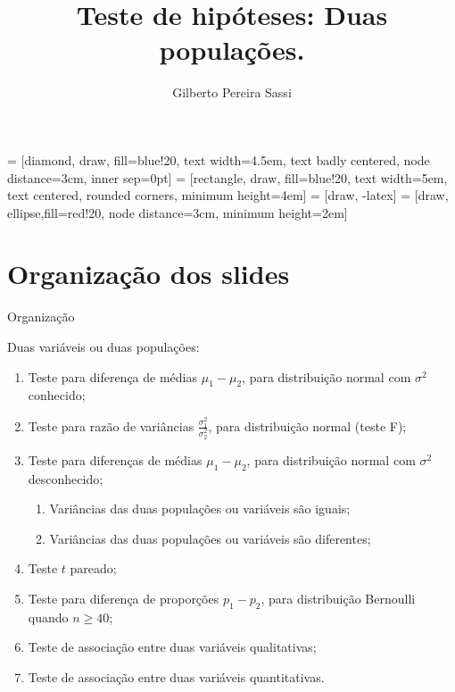 \documentclass[9pt]{beamer}
\date{}
\title[Teste de Hipóteses]{Teste de hipóteses: Duas populações.}
\author[Gilberto Sassi]{Gilberto Pereira Sassi}
\institute[IME -- UFBA]{Universidade Federal da Bahia \\ Instituto de Matem\'{a}tica e Estat\'{i}stica\\ Departamento de Estat\'{i}stica }
\begin{document}
	
 = [diamond, draw, fill=blue!20, 
text width=4.5em, text badly centered, node distance=3cm, inner sep=0pt]
 = [rectangle, draw, fill=blue!20, 
text width=5em, text centered, rounded corners, minimum height=4em]
 = [draw, -latex]
 = [draw, ellipse,fill=red!20, node distance=3cm,
minimum height=2em]
	
\begin{frame}{}
	\maketitle
\end{frame}

\section{Organização dos slides}

\begin{frame}{Organização}

Duas variáveis ou duas populações:
\begin{enumerate}
	\item Teste para diferença de médias $\mu_1 - \mu_2$, para distribuição normal com $\sigma^2$ conhecido;
	\vfill
	
	\item Teste para razão de variâncias $\frac{\sigma_1^2}{\sigma_2^2}$, para distribuição normal (teste F);
	\vfill
	
	\item Teste para diferenças de médias $\mu_1 - \mu_2$, para distribuição normal com $\sigma^2$ desconhecido;
		\begin{enumerate}
			\item Variâncias das duas populações ou variáveis são iguais;
			\item Variâncias das duas populações ou variáveis são diferentes;
		\end{enumerate}
	\vfill
	
	\item Teste $t$ pareado;
	\vfill
	
	
	
	\item Teste para diferença de proporções $p_1 - p_2$, para distribuição Bernoulli quando $n \geq 40$;
	\vfill
	
	\item Teste de associação entre duas variáveis qualitativas;
	\vfill
	
	\item Teste de associação entre duas variáveis quantitativas.
\end{enumerate}

\end{frame}
\end{document}
